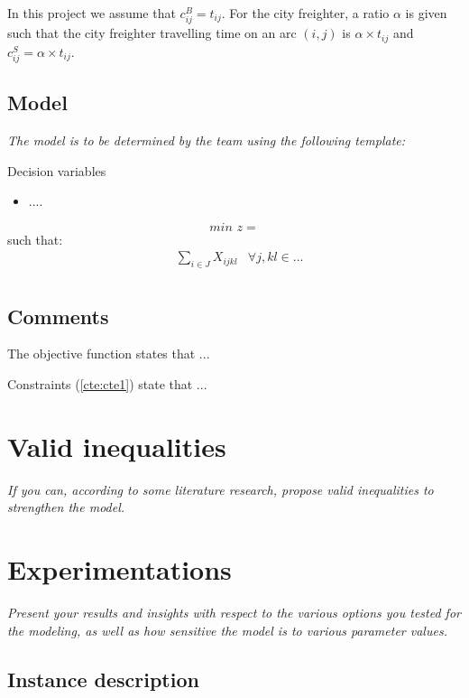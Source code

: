 \documentclass[dvipsnames,authoryear,11pt]{article}
\newcommand{\refp}[1]{(\ref{#1})}
\begin{document}
In this project we assume that $c_{ij}^B=t_{ij}$.
For the city freighter, a ratio $\alpha$ is given such that the city freighter travelling time on an arc $(i,j)$ is $\alpha \times t_{ij}$ and $c_{ij}^S=\alpha \times t_{ij}$. 

	
\subsection{Model}	

\textit{The model is to be determined by the team using the following template:}
	
Decision variables 
	\begin{itemize}
		\item ....
	\end{itemize}

	
	$$\textit{min }z=  \label{obj}$$
	such that:
	\begin{align}
		&\sum_{i \in J } X_{ijkl}& \forall j, k l \in ... \label{cte:cte1}\\
	\end{align}
	
\subsection{Comments}
 
The objective function states that ...

 
Constraints \refp{cte:cte1} state that ...




\section{Valid inequalities}

\textit{If you can, according to some literature research, propose valid inequalities to strengthen the model.}


\section{Experimentations}

\textit{Present your results and insights with respect to the various options you tested for the modeling, as well as how sensitive the model is to various parameter values.}

\subsection{Instance description}
\end{document}
